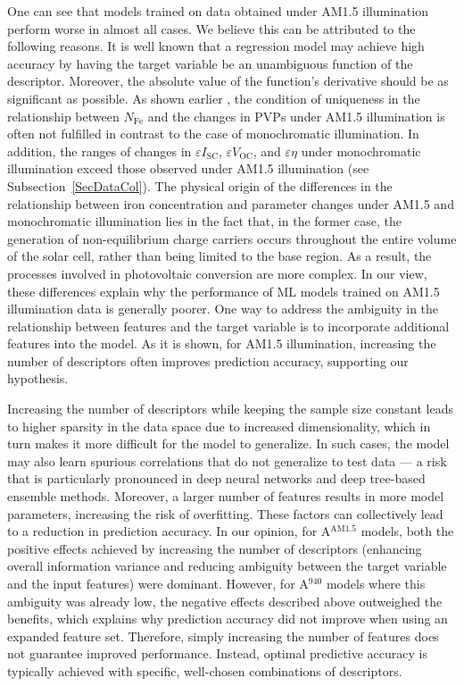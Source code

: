 \documentclass[a4paper,fleqn]{cas-sc}
\begin{document}
One can see that models trained on data obtained under AM1.5 illumination perform worse in almost all cases.
We believe this can be attributed to the following reasons.
It is well known that a regression model may  achieve high accuracy
by having the target variable be an unambiguous function of the descriptor.
Moreover, the absolute value of the function’s derivative should be as significant as possible.
As shown earlier \cite{Olikh2025MSEB}, the condition of uniqueness in the relationship between $N_\mathrm{Fe}$ and
the changes in PVPs under AM1.5 illumination is often not fulfilled in contrast to the case of monochromatic illumination.
In addition, the ranges of changes in $\varepsilon I_\mathrm{SC}$, $\varepsilon V_\mathrm{OC}$, and $\varepsilon \eta$
under monochromatic illumination exceed those observed under AM1.5 illumination (see Subsection~\ref{SecDataCol}).
The physical origin of the differences in the relationship between iron concentration and
parameter changes under AM1.5 and monochromatic illumination lies in the fact that,
in the former case, the generation of non-equilibrium charge carriers occurs throughout the
entire volume of the solar cell, rather than being limited to the base region.
As a result, the processes involved in photovoltaic conversion are more complex.
In our view, these differences explain why the performance of ML models trained on AM1.5 illumination data is generally poorer.
One way to address the ambiguity in the relationship between features and the target variable
is to incorporate additional features into the model.
As it is shown, for AM1.5 illumination, increasing the number of descriptors often improves prediction accuracy, supporting our hypothesis.


Increasing the number of descriptors while keeping the sample size constant leads
to higher sparsity in the data space due to increased dimensionality,
which in turn makes it more difficult for the model to generalize.
In such cases, the model may also learn spurious correlations that do not generalize to test data ---
a risk that is particularly pronounced in deep neural networks and  deep tree-based ensemble methods.
Moreover, a larger number of features results in more model parameters, increasing the risk of overfitting.
These factors can collectively lead to a reduction in prediction accuracy.
In our opinion, for A$^\mathrm{AM1.5}$ models, both the positive effects achieved by increasing the number of descriptors
(enhancing overall information variance and reducing ambiguity between the target variable and the input features) were dominant.
However, for A$^\mathrm{940}$ models where this ambiguity was already low,
the negative effects described above outweighed the benefits,
which explains why prediction accuracy did not improve when using an expanded feature set.
Therefore, simply increasing the number of features does not guarantee improved performance.
Instead, optimal predictive accuracy is typically achieved with specific, well-chosen combinations of descriptors.
\end{document}
